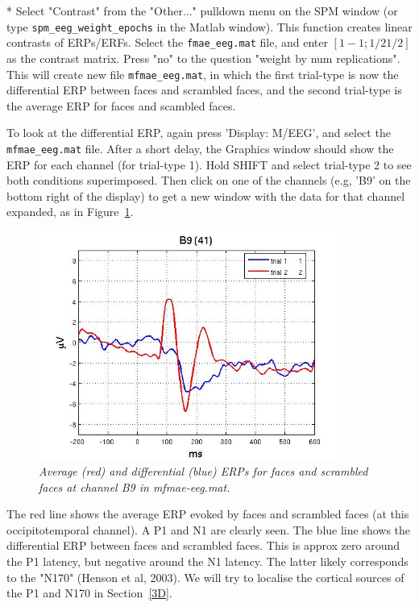 * Select "Contrast" from the "Other..." pulldown menu on the SPM window (or type \verb!spm_eeg_weight_epochs! in the Matlab window). This function creates linear contrasts of ERPs/ERFs. Select the \verb!fmae_eeg.mat! file, and enter $[1 -1; 1/2 1/2]$ as the contrast matrix. Press "no" to the question "weight by num replications". This will create new file \verb!mfmae_eeg.mat!, in which the first trial-type is now the differential ERP between faces and scrambled faces, and the second trial-type is the average ERP for faces and scambled faces.

To look at the differential ERP, again press 'Display: M/EEG', and select the \verb!mfmae_eeg.mat! file. After a short delay, the Graphics window should show the ERP for each channel (for trial-type 1). Hold SHIFT and select trial-type 2 to see both conditions superimposed. Then click on one of the channels (e.g, 'B9' on the bottom right of the display) to get a new window with the data for that channel expanded, as in Figure~\ref{fig_32_4}.

\begin{figure}
\begin{center}
\includegraphics[width=100mm]{multimodal/figures/figure_32_4}
\caption{\em  Average (red) and differential (blue) ERPs for faces and scrambled faces at channel B9 in mfmae-eeg.mat. \label{fig_32_4}}
\end{center}
\end{figure}

The red line shows the average ERP evoked by faces and scrambled faces (at this occipitotemporal channel). A P1 and N1 are clearly seen. The blue line shows the differential ERP between faces and scrambled faces. This is approx zero around the P1 latency, but negative around the N1 latency. The latter likely corresponds to the "N170" (Henson et al, 2003). We will try to localise the cortical sources of the P1 and N170 in Section~\ref{3D}.

